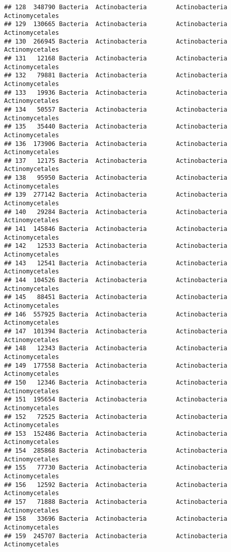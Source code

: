 \documentclass[
]{article}
\begin{document}
\begin{verbatim}
## 128  348790 Bacteria  Actinobacteria        Actinobacteria     Actinomycetales
## 129  130665 Bacteria  Actinobacteria        Actinobacteria     Actinomycetales
## 130  266945 Bacteria  Actinobacteria        Actinobacteria     Actinomycetales
## 131   12168 Bacteria  Actinobacteria        Actinobacteria     Actinomycetales
## 132   79881 Bacteria  Actinobacteria        Actinobacteria     Actinomycetales
## 133   19936 Bacteria  Actinobacteria        Actinobacteria     Actinomycetales
## 134   50557 Bacteria  Actinobacteria        Actinobacteria     Actinomycetales
## 135   35440 Bacteria  Actinobacteria        Actinobacteria     Actinomycetales
## 136  173906 Bacteria  Actinobacteria        Actinobacteria     Actinomycetales
## 137   12175 Bacteria  Actinobacteria        Actinobacteria     Actinomycetales
## 138   95950 Bacteria  Actinobacteria        Actinobacteria     Actinomycetales
## 139  277142 Bacteria  Actinobacteria        Actinobacteria     Actinomycetales
## 140   29284 Bacteria  Actinobacteria        Actinobacteria     Actinomycetales
## 141  145846 Bacteria  Actinobacteria        Actinobacteria     Actinomycetales
## 142   12533 Bacteria  Actinobacteria        Actinobacteria     Actinomycetales
## 143   12541 Bacteria  Actinobacteria        Actinobacteria     Actinomycetales
## 144  104526 Bacteria  Actinobacteria        Actinobacteria     Actinomycetales
## 145   88451 Bacteria  Actinobacteria        Actinobacteria     Actinomycetales
## 146  557925 Bacteria  Actinobacteria        Actinobacteria     Actinomycetales
## 147  101394 Bacteria  Actinobacteria        Actinobacteria     Actinomycetales
## 148   12343 Bacteria  Actinobacteria        Actinobacteria     Actinomycetales
## 149  177558 Bacteria  Actinobacteria        Actinobacteria     Actinomycetales
## 150   12346 Bacteria  Actinobacteria        Actinobacteria     Actinomycetales
## 151  195654 Bacteria  Actinobacteria        Actinobacteria     Actinomycetales
## 152   72525 Bacteria  Actinobacteria        Actinobacteria     Actinomycetales
## 153  152486 Bacteria  Actinobacteria        Actinobacteria     Actinomycetales
## 154  285868 Bacteria  Actinobacteria        Actinobacteria     Actinomycetales
## 155   77730 Bacteria  Actinobacteria        Actinobacteria     Actinomycetales
## 156   12592 Bacteria  Actinobacteria        Actinobacteria     Actinomycetales
## 157   71888 Bacteria  Actinobacteria        Actinobacteria     Actinomycetales
## 158   33696 Bacteria  Actinobacteria        Actinobacteria     Actinomycetales
## 159  245707 Bacteria  Actinobacteria        Actinobacteria     Actinomycetales

\end{verbatim}
\end{document}

